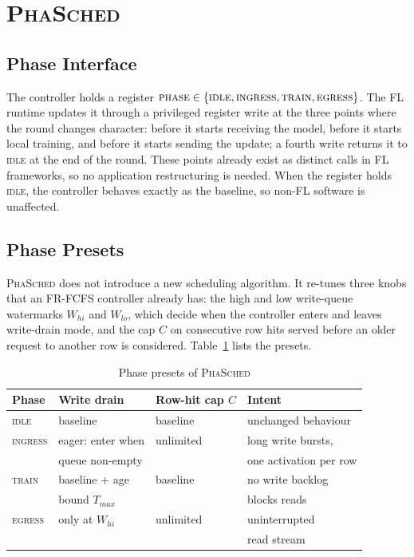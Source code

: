 \documentclass[conference]{IEEEtran}
\newcommand{\name}{\textsc{PhaSched}}
\begin{document}
\section{\name{}}
\subsection{Phase Interface}
The controller holds a register $\textsc{phase}\in\{\textsc{idle},\textsc{ingress},\textsc{train},\textsc{egress}\}$. The FL runtime updates it through a privileged register write at the three points where the round changes character: before it starts receiving the model, before it starts local training, and before it starts sending the update; a fourth write returns it to \textsc{idle} at the end of the round.
These points already exist as distinct calls in FL frameworks, so no application restructuring is needed. When the register holds \textsc{idle}, the controller behaves exactly as the baseline, so non-FL software is unaffected.

\subsection{Phase Presets}
\name{} does not introduce a new scheduling algorithm. It re-tunes three knobs that an FR-FCFS controller already has: the high and low write-queue watermarks $W_{hi}$ and $W_{lo}$, which decide when the controller enters and leaves write-drain mode, and the cap $C$ on consecutive row hits served before an older request to another row is considered. Table~\ref{tab:presets} lists the presets.

\begin{table}[t]
\centering
\caption{Phase presets of \name{}}
\label{tab:presets}
\footnotesize
\begin{tabular}{@{}llll@{}}
\toprule
Phase & Write drain & Row-hit cap $C$ & Intent \\
\midrule
\textsc{idle} & baseline & baseline & unchanged behaviour \\
\textsc{ingress} & eager: enter when & unlimited & long write bursts, \\
 & queue non-empty & & one activation per row \\
\textsc{train} & baseline $+$ age & baseline & no write backlog \\
 & bound $T_{max}$ & & blocks reads \\
\textsc{egress} & only at $W_{hi}$ & unlimited & uninterrupted \\
 & & & read stream \\
\bottomrule
\end{tabular}
\end{table}
\end{document}
